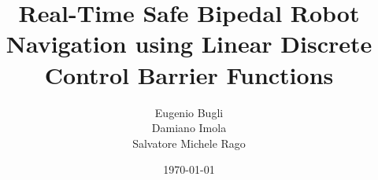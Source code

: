 \documentclass[12pt,a4paper,oneside]{article}
\title{Real-Time Safe Bipedal Robot Navigation using Linear Discrete Control Barrier Functions} %
\author{Eugenio Bugli \\ Damiano Imola \\ Salvatore Michele Rago} %
\date{\today}									    %
\theoremstyle{definition}
\begin{document}

\newpage

\tableofcontents
\newpage


\clearpage


\clearpage


\clearpage


\clearpage



\nocite{*}  %
\end{document}

